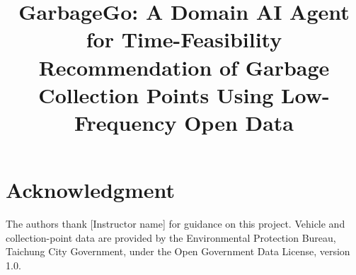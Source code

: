 \documentclass[conference]{IEEEtran}
\begin{document}
\title{GarbageGo: A Domain AI Agent for Time-Feasibility
Recommendation of Garbage Collection Points Using Low-Frequency Open Data}

\author{
\IEEEauthorblockN{[Author 1]}
\and
{}
\and
\IEEEauthorblockN{[Author 3]}
\and
\IEEEauthorblockN{[Author 4]}
}

\maketitle








\section*{Acknowledgment}
The authors thank [Instructor name] for guidance on this project.
Vehicle and collection-point data are provided by the Environmental
Protection Bureau, Taichung City Government, under the Open Government
Data License, version 1.0.



\end{document}
